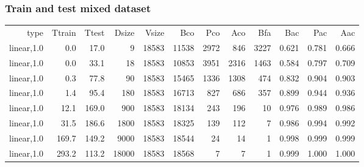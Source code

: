 \subsubsection{Train and test mixed dataset}
\begin{longtable}{r|r|r|r|r|r|r|r|r|r|r|r}
          type &  Ttrain &   Ttest & Dsize & Vsize &   Bco &   Pco &   Aco &   Bfa &   Bac &   Pac &   Aac \\
   linear,1.0  &     0.0 &    17.0 &     9 & 18583 & 11538 &  2972 &   846 &  3227 & 0.621 & 0.781 & 0.666 \\
   linear,1.0  &     0.0 &    33.1 &    18 & 18583 & 10853 &  3951 &  2316 &  1463 & 0.584 & 0.797 & 0.709 \\
   linear,1.0  &     0.3 &    77.8 &    90 & 18583 & 15465 &  1336 &  1308 &   474 & 0.832 & 0.904 & 0.903 \\
   linear,1.0  &     1.4 &    95.4 &   180 & 18583 & 16713 &   827 &   686 &   357 & 0.899 & 0.944 & 0.936 \\
   linear,1.0  &    12.1 &   169.0 &   900 & 18583 & 18134 &   243 &   196 &    10 & 0.976 & 0.989 & 0.986 \\
   linear,1.0  &    31.5 &   186.6 &  1800 & 18583 & 18325 &   139 &   112 &     7 & 0.986 & 0.994 & 0.992 \\
   linear,1.0  &   169.7 &   149.2 &  9000 & 18583 & 18544 &    24 &    14 &     1 & 0.998 & 0.999 & 0.999 \\
   linear,1.0  &   293.2 &   113.2 & 18000 & 18583 & 18568 &     7 &     7 &     1 & 0.999 & 1.000 & 1.000 \\
\end{longtable}